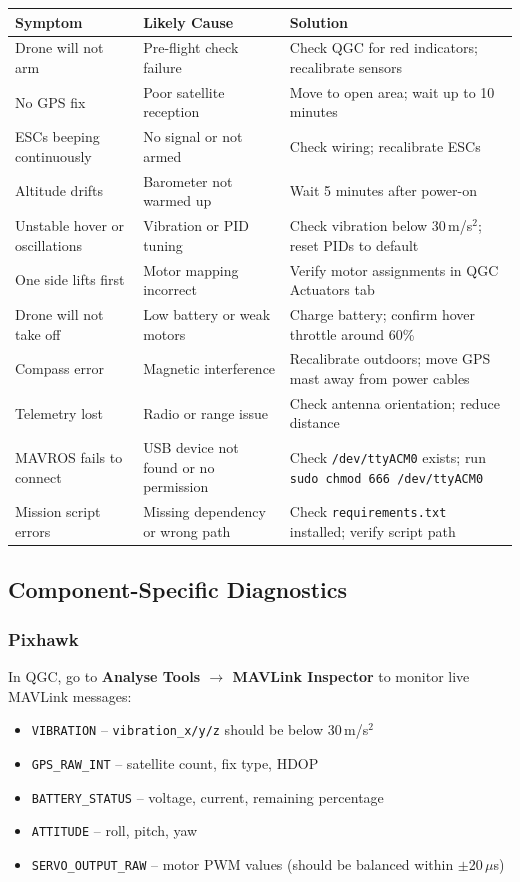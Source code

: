 \documentclass{article}
\begin{document}
\begin{longtable}{p{3.8cm}p{4.2cm}p{5.5cm}}
\toprule
\textbf{Symptom} & \textbf{Likely Cause} & \textbf{Solution} \\
\midrule
\endhead
Drone will not arm & Pre-flight check failure & Check QGC for red indicators; recalibrate sensors \\
No GPS fix & Poor satellite reception & Move to open area; wait up to 10 minutes \\
ESCs beeping continuously & No signal or not armed & Check wiring; recalibrate ESCs \\
Altitude drifts & Barometer not warmed up & Wait 5 minutes after power-on \\
Unstable hover or oscillations & Vibration or PID tuning & Check vibration below 30\,m/s$^2$; reset PIDs to default \\
One side lifts first & Motor mapping incorrect & Verify motor assignments in QGC Actuators tab \\
Drone will not take off & Low battery or weak motors & Charge battery; confirm hover throttle around 60\% \\
Compass error & Magnetic interference & Recalibrate outdoors; move GPS mast away from power cables \\
Telemetry lost & Radio or range issue & Check antenna orientation; reduce distance \\
MAVROS fails to connect & USB device not found or no permission & Check \texttt{/dev/ttyACM0} exists; run \texttt{sudo chmod 666 /dev/ttyACM0} \\
Mission script errors & Missing dependency or wrong path & Check \texttt{requirements.txt} installed; verify script path \\
\bottomrule
\end{longtable}

\subsection{Component-Specific Diagnostics}

\subsubsection{Pixhawk}

In QGC, go to \textbf{Analyse Tools $\rightarrow$ MAVLink Inspector} to monitor live MAVLink messages:

\begin{itemize}
    \item \texttt{VIBRATION} -- \texttt{vibration\_x/y/z} should be below 30\,m/s$^2$
    \item \texttt{GPS\_RAW\_INT} -- satellite count, fix type, HDOP
    \item \texttt{BATTERY\_STATUS} -- voltage, current, remaining percentage
    \item \texttt{ATTITUDE} -- roll, pitch, yaw
    \item \texttt{SERVO\_OUTPUT\_RAW} -- motor PWM values (should be balanced within $\pm$20\,$\mu$s)
\end{itemize}
\end{document}
